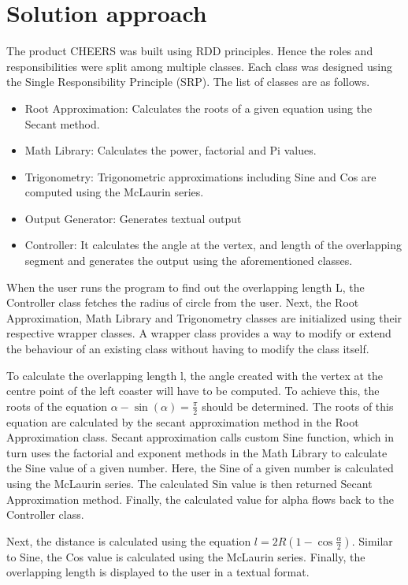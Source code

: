 \section{Solution approach}
  \begin{flushleft}
    The product CHEERS was built using RDD principles. Hence the roles and responsibilities were split among multiple classes. Each class was designed using the Single Responsibility Principle (SRP). The list of classes are as follows.
    \begin{itemize}
      \item Root Approximation: Calculates the roots of a given equation using the Secant method.
      \item Math Library: Calculates the power, factorial and Pi values.
      \item Trigonometry: Trigonometric approximations including Sine and Cos are computed using the McLaurin series.
      \item Output Generator: Generates textual output
      \item Controller: It calculates the angle at the vertex, and length of the overlapping segment and generates the output using the aforementioned classes.
    \end{itemize}

    When the user runs the program to find out the overlapping length L, the Controller class fetches the radius of circle from the user. Next, the Root Approximation, Math Library and Trigonometry classes are initialized using their respective wrapper classes. A wrapper class provides a way to modify or extend the behaviour of an existing class without having to modify the class itself. 
    \end{flushleft}
    \begin{flushleft}
      To calculate the overlapping length l, the angle created with the vertex at the centre point of the left coaster will have to be computed. To achieve this, the roots of the equation $\alpha - \sin(\alpha) = \frac{\pi}{2}$ should be determined. 
      The roots of this equation are calculated by the secant approximation method in the Root Approximation class. Secant approximation calls custom Sine function, which in turn uses the factorial and exponent methods in the Math Library to calculate the Sine value of a given number. 
      Here, the Sine of a given number is calculated using the McLaurin series. The calculated Sin value is then returned Secant Approximation method. 
      Finally, the calculated value for alpha flows back to the Controller class.
    \end{flushleft}
    \begin{flushleft}
      Next, the distance is calculated using the equation $l = 2R\left(1 - \cos\frac{\alpha}{2}\right)$. Similar to Sine, the Cos value is calculated using the McLaurin series. Finally, the overlapping length is displayed to the user in a textual format.
  \end{flushleft}
    \pagebreak

